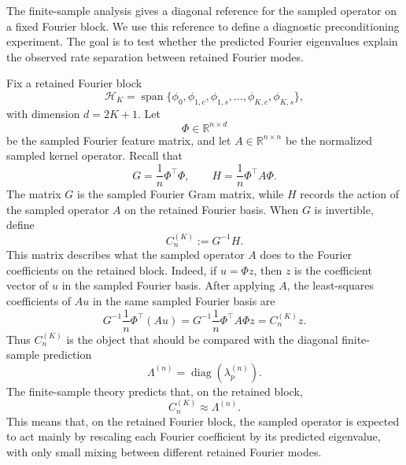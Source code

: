 The finite-sample analysis gives a diagonal reference for the sampled operator
on a fixed Fourier block. We use this reference to define a diagnostic
preconditioning experiment. The goal is to test whether the predicted Fourier
eigenvalues explain the observed rate separation between retained Fourier
modes.

Fix a retained Fourier block
\[
	\mathcal H_K
	=
	\operatorname{span}\{\phi_0,\phi_{1,c},\phi_{1,s},\dots,\phi_{K,c},\phi_{K,s}\},
\]
with dimension \(d=2K+1\). Let
\[
	\Phi\in\mathbb R^{n\times d}
\]
be the sampled Fourier feature matrix, and let \(A\in\mathbb R^{n\times n}\) be
the normalized sampled kernel operator. Recall that
\begin{equation}
	G=\frac1n\Phi^\top\Phi,
	\qquad
	H=\frac1n\Phi^\top A\Phi.
	\label{eq:method-preconditioning-GH}
\end{equation}
The matrix \(G\) is the sampled Fourier Gram matrix, while \(H\) records the
action of the sampled operator \(A\) on the retained Fourier basis.
When \(G\) is invertible, define
\begin{equation}
	C_n^{(K)}
	:=
	G^{-1}H.
	\label{eq:method-sampled-coefficient-operator}
\end{equation}
This matrix describes what the sampled operator \(A\) does to the Fourier
coefficients on the retained block. Indeed, if \(u=\Phi z\), then \(z\) is the
coefficient vector of \(u\) in the sampled Fourier basis. After applying \(A\),
the least-squares coefficients of \(Au\) in the same sampled Fourier basis are
\begin{equation}
	G^{-1}\frac1n\Phi^\top (Au)
	=
	G^{-1}\frac1n\Phi^\top A\Phi z
	=
	C_n^{(K)}z.
	\label{eq:method-sampled-coefficient-action}
\end{equation}
Thus \(C_n^{(K)}\) is the object that should be compared with the diagonal
finite-sample prediction
\begin{equation}
	\Lambda^{(n)}
	=
	\operatorname{diag}(\lambda_p^{(n)}).
	\label{eq:method-preconditioning-lambda-n}
\end{equation}
The finite-sample theory predicts that, on the retained block,
\begin{equation}
	C_n^{(K)}
	\approx
	\Lambda^{(n)}.
	\label{eq:method-coefficient-operator-approx}
\end{equation}
This means that, on the retained Fourier block, the sampled operator is expected
to act mainly by rescaling each Fourier coefficient by its predicted eigenvalue,
with only small mixing between different retained Fourier modes.


